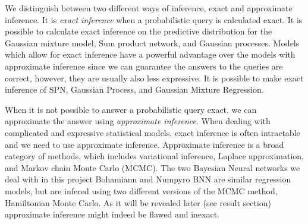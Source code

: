 We distinguish between two different ways of inference, exact and approximate inference.
It is \textit{exact inference} when a probabilistic query is calculated exact. It is possible to calculate exact inference on 
the predictive distribution for the Gaussian mixture model, Sum product network, and Gaussian processes. Models which allow 
for exact inference have a powerful advantage over the models with approximate inference since we can guarantee
 the answers to the queries are
correct, however, they are usually also less expressive. It is possible to
make exact inference of SPN, Gaussian Process, and Gaussian Mixture Regression. 

When it is not possible to answer a probabilistic query exact, we can approximate the
answer using \textit{approximate inference}. When dealing with complicated and expressive statistical models, exact inference is often
intractable and we need to use approximate inference. Approximate inference 
is a broad category of methods, which includes 
variational inference, Laplace approximation, and Markov chain Monte Carlo (MCMC).
The two Bayesian Neural networks we deal with in this project Bohamiann and Numpyro BNN are
similar regression models, but are infered using two different versions of the MCMC 
method, Hamiltonian Monte Carlo. As it will be revealed later (see result section) 
approximate inference might indeed be flawed and inexact. 

